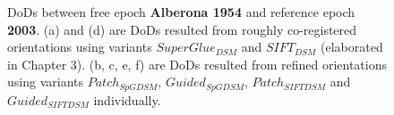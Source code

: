 \begin{figure}[htbp]
\begin{center}
{\begin{minipage}[t]{0.31\linewidth}
			\end{minipage}%
		}
		
		\caption{{\scriptsize \ac{DoD}s between free epoch \textbf{Alberona 1954} and reference epoch \textbf{2003}. (a) and (d) are \ac{DoD}s resulted from roughly co-registered orientations using variants $SuperGlue_{DSM}$ and $SIFT_{DSM}$ (elaborated in Chapter 3). (b, c, e, f) are \ac{DoD}s resulted from refined orientations using variants $Patch_{SpGDSM}$, $Guided_{SpGDSM}$, $Patch_{SIFTDSM}$ and $Guided_{SIFTDSM}$ individually.}}
		\label{PreciseDoDAlberona}
	\end{center}
\end{figure} 


